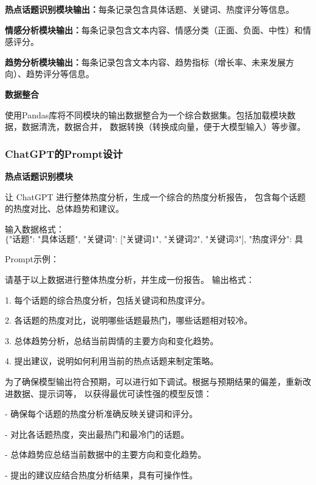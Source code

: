 \documentclass[UTF8,a4paper,15pt,titlepage,oneside]{ctexbook}
\begin{document}
\textbf{热点话题识别模块输出：}每条记录包含具体话题、关键词、热度评分等信息。

\textbf{情感分析模块输出：}每条记录包含文本内容、情感分类（正面、负面、中性）和情感评分。

\textbf{趋势分析模块输出：}每条记录包含文本内容、趋势指标（增长率、未来发展方向）、趋势评分等信息。

\vskip 0.2cm
\noindent
\textbf{数据整合}

使用Pandas库将不同模块的输出数据整合为一个综合数据集。包括加载模块数据，数据清洗，数据合并，
数据转换（转换成向量，便于大模型输入）等步骤。

\subsubsection{ChatGPT的Prompt设计}

\vskip 0.2cm
\noindent
\textbf{热点话题识别模块}

让 ChatGPT 进行整体热度分析，生成一个综合的热度分析报告，
包含每个话题的热度对比、总体趋势和建议。

输入数据格式：
\begin{equation}
  \text{{\{"话题": "具体话题", "关键词": ["关键词1", "关键词2", "关键词3"], "热度评分": 具体评分\}}}
\end{equation}

Prompt示例：

\begin{mdframed}[backgroundcolor=lightgray!20, linecolor=darkgray, linewidth=1pt]
  请基于以上数据进行整体热度分析，并生成一份报告。
输出格式：

1. 每个话题的综合热度分析，包括关键词和热度评分。

2. 各话题的热度对比，说明哪些话题最热门，哪些话题相对较冷。

3. 总体趋势分析，总结当前舆情的主要方向和变化趋势。

4. 提出建议，说明如何利用当前的热点话题来制定策略。
  \end{mdframed}

为了确保模型输出符合预期，可以进行如下调试。根据与预期结果的偏差，重新改进数据、提示词等，
以获得最优可读性强的模型反馈：

- 确保每个话题的热度分析准确反映关键词和评分。

- 对比各话题热度，突出最热门和最冷门的话题。

- 总体趋势应总结当前数据中的主要方向和变化趋势。

- 提出的建议应结合热度分析结果，具有可操作性。
\end{document}

